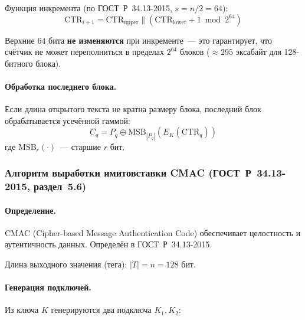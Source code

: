 \documentclass[a4paper,14pt]{extarticle}
\begin{document}
Функция инкремента (по ГОСТ~Р~34.13-2015, $s = n/2 = 64$):
\begin{equation}
    \mathrm{CTR}_{i+1} = \mathrm{CTR}_{\mathrm{upper}} \| (\mathrm{CTR}_{\mathrm{lower}} + 1 \bmod 2^{64})
\end{equation}

Верхние 64 бита \textbf{не изменяются} при инкременте~--- это гарантирует, что счётчик не может переполниться в пределах $2^{64}$ блоков ($\approx 295$ эксабайт для 128-битного блока).

\paragraph{Обработка последнего блока.}

Если длина открытого текста не кратна размеру блока, последний блок обрабатывается усечённой гаммой:
\begin{equation}
    C_q = P_q \oplus \mathrm{MSB}_{|P_q|}(E_K(\mathrm{CTR}_q))
\end{equation}
где $\mathrm{MSB}_r(\cdot)$~--- старшие $r$ бит.

\subsubsection{Алгоритм выработки имитовставки CMAC (ГОСТ~Р~34.13-2015, раздел~5.6)}

\paragraph{Определение.}

CMAC (Cipher-based Message Authentication Code) обеспечивает целостность и аутентичность данных. Определён в ГОСТ~Р~34.13-2015.

Длина выходного значения (тега): $|T| = n = 128$ бит.

\paragraph{Генерация подключей.}

Из ключа $K$ генерируются два подключа $K_1, K_2$:
\end{document}
